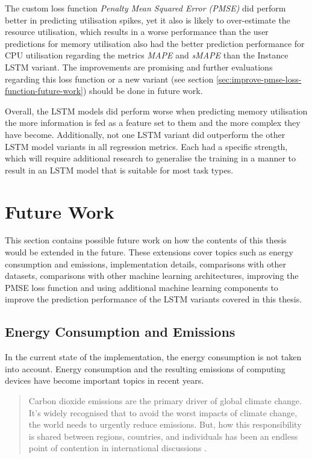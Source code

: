        The custom loss function \emph{Penalty Mean Squared Error (PMSE)} did perform better in predicting utilisation spikes, yet it also is likely to over-estimate the resource utilisation, which results in a worse performance than the user predictions for memory utilisation also had the better prediction performance for CPU utilisation regarding the metrics \emph{MAPE} and \emph{sMAPE} than the Instance LSTM variant.
        The improvements are promising and further evaluations regarding this loss function or a new variant (see section \ref{sec:improve-pmse-loss-function-future-work}) should be done in future work.

        Overall, the LSTM models did perform worse when predicting memory utilisation the more information is fed as a feature set to them and the more complex they have become.
        Additionally, not one LSTM variant did outperform the other LSTM model variants in all regression metrics.
        Each had a specific strength, which will require additional research to generalise the training in a manner to result in an LSTM model that is suitable for most task types. 



    \section{Future Work}
    \label{sec:future-work}

        This section contains possible future work on how the contents of this thesis would be extended in the future.
        These extensions cover topics such as energy consumption and \COTWO emissions, implementation details, comparisons with other datasets, comparisons with other machine learning architectures, improving the PMSE loss function and using additional machine learning components to improve the prediction performance of the LSTM variants covered in this thesis.

        \subsection{Energy Consumption and \COTWO Emissions}
        \label{sec:energy-consumption-future-work}

            In the current state of the implementation, the energy consumption is not taken into account.
            Energy consumption and the resulting \COTWO emissions of computing devices have become important topics in recent years.

            \begin{quote}
                Carbon dioxide emissions are the primary driver of global climate change. It's widely recognised that to avoid the worst impacts of climate change, the world needs to urgently reduce emissions. But, how this responsibility is shared between regions, countries, and individuals has been an endless point of contention in international discussions \cite{ritchieCOGreenhouseGas2020}.
            \end{quote}

